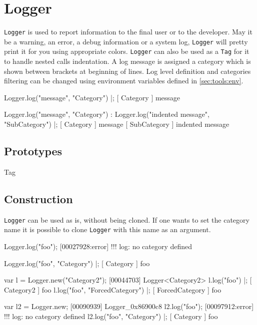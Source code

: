 
\section{Logger}

\lstinline|Logger| is used to report information to the final user or to the
developer. May it be a warning, an error, a debug information or a system
log, \lstinline|Logger| will pretty print it for you using appropriate
colors. \lstinline|Logger| can also be used as a \lstinline|Tag| for it to
handle nested calls indentation. A log message is assigned a category which
is shown between brackets at beginning of lines. Log level definition and
categories filtering can be changed using environment variables defined in
\autoref{sec:tools:env}.

\begin{urbiscript}
Logger.log("message", "Category") |;
[       Category        ] message

Logger.log("message", "Category") :
{
  Logger.log("indented message", "SubCategory")
}|;
[       Category        ] message
[      SubCategory      ]   indented message
\end{urbiscript}

\subsection{Prototypes}
\begin{refObjects}
\item[Tag]
\end{refObjects}

\subsection{Construction}

\lstinline|Logger| can be used as is, without being cloned. If one wants to
set the category name it is possible to clone \lstinline|Logger| with this
name as an argument.

\begin{urbiscript}
Logger.log("foo");
[00027928:error] !!! log: no category defined

Logger.log("foo", "Category") |;
[       Category        ] foo

var l = Logger.new("Category2");
[00044703] Logger<Category2>
l.log("foo") |;
[       Category2       ] foo
l.log("foo", "ForcedCategory") |;
[    ForcedCategory     ] foo

var l2 = Logger.new;
[00090939] Logger_0x86900c8
l2.log("foo");
[00097912:error] !!! log: no category defined
l2.log("foo", "Category") |;
[       Category        ] foo
\end{urbiscript}

